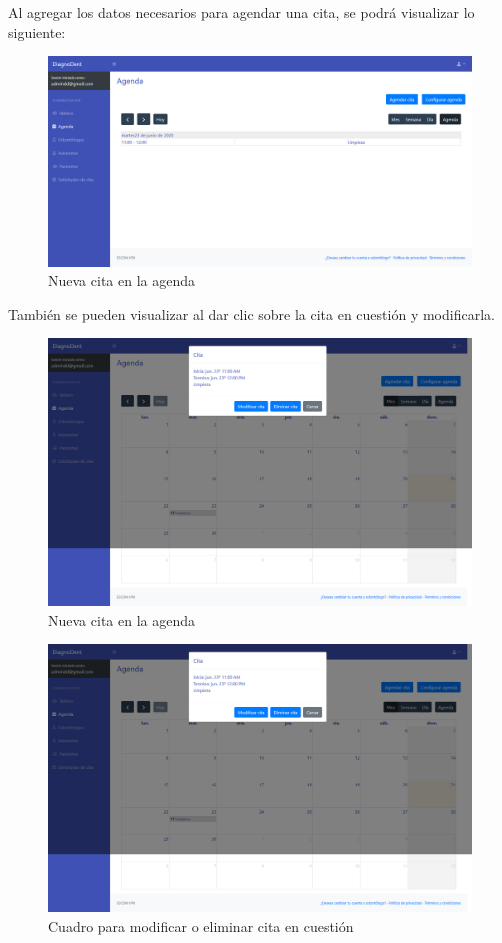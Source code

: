 Al agregar los datos necesarios para agendar una cita, se podrá visualizar lo siguiente:


\begin{figure}[H]
\centering
\includegraphics[width=17cm,keepaspectratio]{pictures/adminodo/citas/agenda-3-1.png}
\caption{Nueva cita en la agenda}
\end{figure}

También se pueden visualizar al dar clic  sobre la cita en cuestión y modificarla.

\begin{figure}[H]
\centering
\includegraphics[width=17cm,keepaspectratio]{pictures/adminodo/citas/agenda-ver-cita.png}
\caption{Nueva cita en la agenda}
\end{figure}

\begin{figure}[H]
\centering
\includegraphics[width=17cm,keepaspectratio]{pictures/adminodo/citas/agenda-ver-cita.png}
\caption{Cuadro para modificar o eliminar cita en cuestión}
\end{figure}

